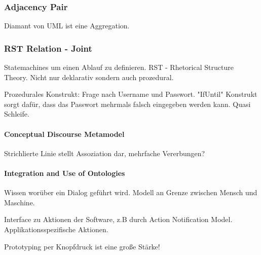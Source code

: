 \subsubsection{Adjacency Pair}
Diamant von UML ist eine Aggregation.

\subsubsection{RST Relation - Joint}
Statemachines um einen Ablauf zu definieren. RST - Rhetorical Structure Theory.
Nicht nur deklarativ sondern auch prozedural. 

Prozedurales Konstrukt: Frage nach Username und Passwort. "IfUntil" Konstrukt
sorgt dafür, dass das Passwort mehrmals falsch eingegeben werden kann. Quasi Schleife.

\paragraph{Conceptual Discourse Metamodel}
Strichlierte Linie stellt Assoziation dar, mehrfache Vererbungen?
\paragraph{Integration and Use of Ontologies}
Wissen worüber ein Dialog geführt wird. Modell an Grenze zwischen Mensch und Maschine.

Interface zu Aktionen der Software, z.B durch Action Notification Model.
Applikationsspezifische Aktionen.

Prototyping per Knopfdruck ist eine große Stärke!


